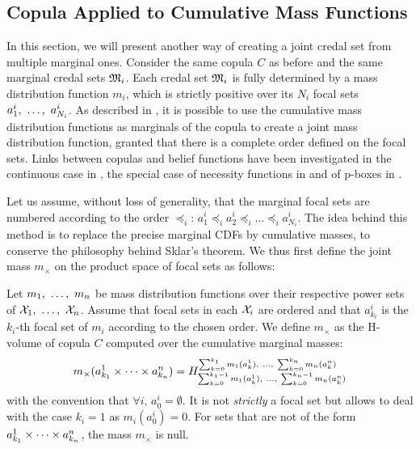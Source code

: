 \subsection{Copula Applied to Cumulative Mass Functions}\label{sec:joint_mass}
In this section, we will present another way of creating a joint credal set from multiple marginal ones. Consider the same copula $C$ as before and the same marginal credal sets $\mathfrak{M}_i$. Each credal set $\mathfrak{M}_i$ is fully determined by a mass distribution function $m_i$, which is strictly positive over its $N_i$ focal sets $a^i_1 , ~\dots, ~ a^i_{N_i}$. As described in \cite{ferson_dependence_2004}, it is possible to use the cumulative mass distribution functions as marginals of the copula to create a joint mass distribution function, granted that there is a complete order defined on the focal sets. Links between copulas and belief functions have been investigated in the continuous case in \cite{schmelzer_joint_2015, schmelzer_multivariate_2019}, the special case of necessity functions in \cite{schmelzer_sklars_2015} and of p-boxes in \cite{schmelzer_random_2023}.

Let us assume, without loss of generality, that the marginal focal sets are numbered according to the order $\preceq_i$: $a^i_1\preceq_ia^i_2\preceq_i\dots\preceq_i a^i_{N_i}$. The idea behind this method is to replace the precise marginal CDFs by cumulative masses, to conserve the philosophy behind Sklar's theorem. We thus first define the joint mass $m_\times$ on the product space of focal sets as follows:

\begin{definition}\label{def:joint_mass}
    Let $m_1 , ~\dots, ~ m_n$ be mass distribution functions over their respective power sets of $\mathcal{X}_1 , ~\dots, ~ \mathcal{X}_n$. Assume that focal sets in each $\mathcal{X}_i$ are ordered and that $a_{k_i}^i$ is the $k_i$-th focal set of $m_i$ according to the chosen order. We define $m_\times$ as the H-volume of copula $C$ computed over the cumulative marginal masses:
    \begin{eqnarray}\label{eq:joint_mass}
        m_\times(a^1_{k_1}\times\dots\times a^n_{k_n}) = H_{\sum_{k=0}^{k_1-1}m_1(a^1_k) , ~\dots, ~ \sum_{k=0}^{k_n-1}m_n(a^n_k)}^{\sum_{k=0}^{k_1}m_1(a^1_k) , ~\dots, ~ \sum_{k=0}^{k_n}m_n(a^n_k)}
    \end{eqnarray}
    with the convention that $\forall i,\, a^i_0=\emptyset$. It is not \textit{strictly} a focal set but allows to deal with the case $k_i=1$ as $m_i(a^i_0)=0$. For sets that are not of the form $a^1_{k_1}\times\dots\times a^n_{k_n}$, the mass $m_\times$ is null.
\end{definition}

